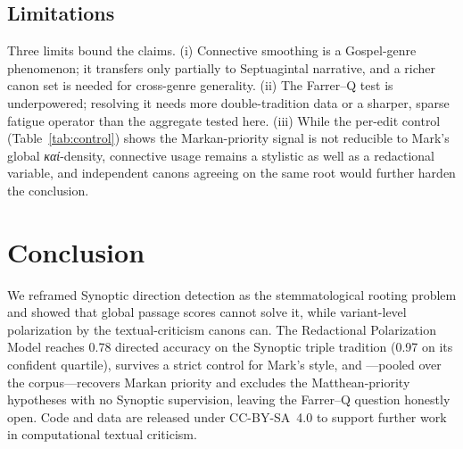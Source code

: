 \documentclass[11pt,letterpaper]{article}
\newcommand{\gk}[1]{{\greekfont\itshape #1}}
\begin{document}
\subsection{Limitations}

Three limits bound the claims. (i) Connective smoothing is a Gospel-genre phenomenon; it transfers
only partially to Septuagintal narrative, and a richer canon set is needed for cross-genre
generality. (ii) The Farrer--Q test is underpowered; resolving it needs more double-tradition
data or a sharper, sparse fatigue operator than the aggregate tested here. (iii) While the
per-edit control (Table~\ref{tab:control}) shows the Markan-priority signal is not reducible to
Mark's global \gk{καί}-density, connective usage remains a stylistic as well as a redactional
variable, and independent canons agreeing on the same root would further harden the conclusion.

\section{Conclusion}
\label{sec:conclusion}

We reframed Synoptic direction detection as the stemmatological rooting problem and showed that
global passage scores cannot solve it, while variant-level polarization by the textual-criticism
canons can. The Redactional Polarization Model reaches 0.78 directed accuracy on the Synoptic
triple tradition (0.97 on its confident quartile), survives a strict control for Mark's style, and
---pooled over the corpus---recovers Markan priority and excludes the Matthean-priority hypotheses
with no Synoptic supervision, leaving the Farrer--Q question honestly open. Code and data are
released under CC-BY-SA~4.0 to support further work in computational textual criticism.



\end{document}
